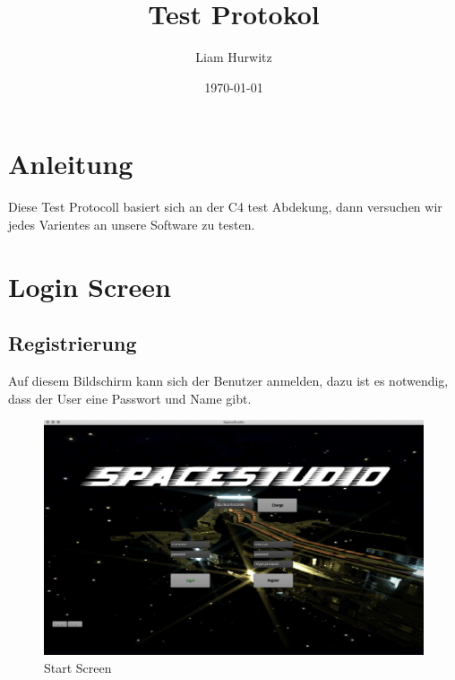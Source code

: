 \documentclass[12pt]{article}
\author{Liam Hurwitz}
\date{\today}
\title{Test Protokol}
\begin{document}
\maketitle
\newpage
\tableofcontents

\newpage
\section{Anleitung}
Diese Test Protocoll basiert sich an der C4 test Abdekung, dann versuchen wir jedes Varientes an unsere Software zu testen.

\section{Login Screen}

\label{sec:orgc5dc561}
\subsection{Registrierung}
Auf diesem Bildschirm kann sich der Benutzer anmelden, dazu ist es notwendig, dass der User eine Passwort und Name gibt.\\
\begin{figure}[htp]
\centering
\includegraphics[scale=0.4]{TestProtocolBilder/startScreen.jpg}
\caption{Start Screen}
\end{figure}

\newpage
\end{document}
